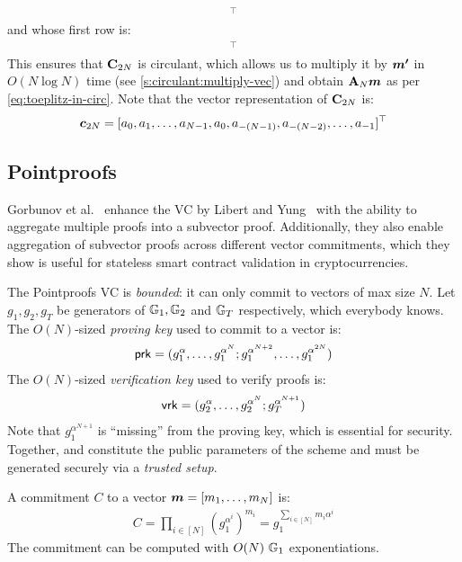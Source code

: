 \begin{align}
    [a_0,a_{-(N-1)},a_{-(N-2)},\dots,a_{-1}]^\top
\end{align}
and whose first row is:
\begin{align}
    [a_0,a_{N-1},a_{N-2},\dots,a_{1}]^\top
\end{align}
This ensures that $\mathbf{C}_{2N}$ is circulant, which allows us to multiply it by $\bm{m'}$ in $O(N\log{N})$ time (see \cref{s:circulant:multiply-vec}) and obtain $\mathbf{A}_N \bm{m}$ as per \cref{eq:toeplitz-in-circ}.
Note that the vector representation of $\mathbf{C}_{2N}$ is:
\begin{align}
    \bm{c}_{2N} = [a_0, a_1, \dots, a_{N-1}, a_0,a_{-(N-1)},a_{-(N-2)},\dots,a_{-1}]^\top
\end{align}

\subsection{Pointproofs}
\label{s:pointproofs}

Gorbunov et al.~\cite{GRWZ20} enhance the VC by Libert and Yung~\cite{LY10} with the ability to aggregate multiple proofs into a subvector proof.
Additionally, they also enable aggregation of subvector proofs across different vector commitments, which they show is useful for stateless smart contract validation in cryptocurrencies.

The Pointproofs VC is \textit{bounded}: it can only commit to vectors of max size $N$.
Let $g_1,g_2,g_T$ be generators of $\mathbb{G}_1, \mathbb{G}_2$ and $\mathbb{G}_T$ respectively, which everybody knows.
The $O(N)$-sized \textit{proving key} used to commit to a vector is:
\begin{align}
    \mathsf{prk} = (g_1^{\alpha},\dots, g_1^{\alpha^N}; g_1^{\alpha^{N+2}},\dots, g_1^{\alpha^{2N}})
\end{align}
The $O(N)$-sized \textit{verification key} used to verify proofs is:
\begin{align}
    \mathsf{vrk} = (g_2^{\alpha},\dots,g_2^{\alpha^N}; g_T^{\alpha^{N+1}})
\end{align}
Note that $g_1^{\alpha^{N+1}}$ is ``missing'' from the proving key, which is essential for security.
Together, \prk and \vrk constitute the public parameters of the scheme and must be generated securely via a \textit{trusted setup}.

A commitment $C$ to a vector $\bm{m}=[m_1,\dots,m_N]$ is:
\begin{align}
    C = \prod_{i\in[N]} \left(g_1^{\alpha^i}\right)^{m_i}
      = g_1^{\sum_{i\in [N]} m_i\alpha^i}
\end{align}
The commitment can be computed with $O(N)\ \mathbb{G}_1$ exponentiations.

